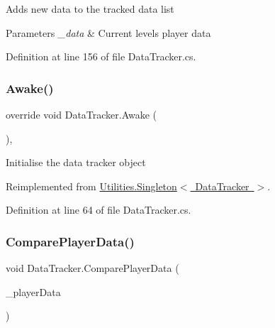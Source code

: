 Adds new data to the tracked data list 


\begin{DoxyParams}{Parameters}
{\em \+\_\+data} & Current levels player data\\
\hline
\end{DoxyParams}


Definition at line 156 of file Data\+Tracker.\+cs.

\mbox{\label{class_data_tracker_a683df3af0a4675dc96498519641f6c53}} 
\subsubsection{\texorpdfstring{Awake()}{Awake()}}
{\footnotesize\ttfamily override void Data\+Tracker.\+Awake (\begin{DoxyParamCaption}{ }\end{DoxyParamCaption})\hspace{0.3cm}{\ttfamily [protected]}, {\ttfamily [virtual]}}



Initialise the data tracker object 



Reimplemented from \mbox{\hyperlink{class_utilities_1_1_singleton_a634b915d7ac492899512de602d59e650}{Utilities.\+Singleton$<$ Data\+Tracker $>$}}.



Definition at line 64 of file Data\+Tracker.\+cs.

\mbox{\label{class_data_tracker_a4869a1c8785620380fa42fef58d7ad6a}} 
\subsubsection{\texorpdfstring{Compare\+Player\+Data()}{ComparePlayerData()}}
{\footnotesize\ttfamily void Data\+Tracker.\+Compare\+Player\+Data (\begin{DoxyParamCaption}\item[{\mbox{\hyperlink{struct_player_data}{Player\+Data}}}]{\+\_\+player\+Data }\end{DoxyParamCaption})}



